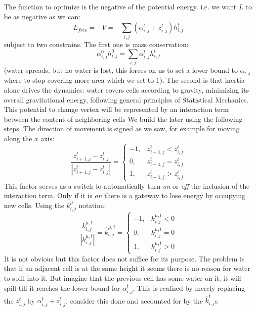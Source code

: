 \documentclass[%
 reprint,
 amsmath,amssymb,
 aps,
]{revtex4-2}
\begin{document}
The function to optimize is the negative of the potential energy. i.e. we want $L$ to be as negative as we can:
 \begin{equation}
  L_{free} = -V = -  \sum_{i,j}(\alpha_{i,j}^t + z_{i,j}^t)h_{i,j}^t
\end{equation}
subject to two constrains. The first one is mass conservation: 
\begin{equation}
    \alpha_{i,j}^0h_{i,j}^0 = \sum_{i,j}\alpha_{i,j}^th_{i,j}^t
\end{equation}
 (water spreads, but no water is lost, this forces on us to set a lower bound to $\alpha_{i,j}$ where to stop covering more area which we set to $1$). The second is that inertia alone drives the dynamics: water covers cells according to gravity, minimizing its overall gravitational energy, following general principles of Statistical Mechanics\cite{Stat_Mec_Unconf2021}. This potential to change vertex will be represented by an interaction term between the content of neighboring cells We build the later using the following steps. The direction of movement is signed as we saw, for example for moving along the $x$ axis: 
 \begin{equation}    
  \frac{z_{i+1,j}^t - z_{i,j}^t }{|z_{i+1,j}^t - z_{i,j}^t|}=\begin{cases}-1, &  z_{i+1,j}^t < z_{i,j}^t \\0,  &  z_{i+1,j}^t = z_{i,j}^t\\1,  &  z_{i+1,j}^t > z_{i,j}^t 
\end{cases}
 \end{equation}
 This factor serves as a switch to automatically turn \textit{on} or \textit{off} the inclusion of the interaction term. Only if it is \textit{on} there is a gateway to lose energy by occupying new cells. Using the $k_{i,j}^\mu$ notation:
 \begin{equation}    
  \frac{k_{i,j}^{\mu, t}}{|k_{i,j}^{\mu, t}|}=\hat{k}_{i,j}^{\mu,t}=\begin{cases}-1, &  k_{i,j}^{\mu,t} < 0\\0,  &  k_{i,j}^{\mu,t} = 0\\1,  &  k_{i,j}^{\mu,t} > 0
\end{cases}
\end{equation}
It is not obvious but this factor does not suffice for its purpose. The problem is that if an adjacent cell is at the same height it seems there is no reason for water to spill into it. But imagine that the previous cell has some water on it, it will spill till it reaches the lower bound for $\alpha_{i,j}^t$. This is realized by merely replacing the $z_{i,j}^t$ by $\alpha_{i,j}^t + z_{i,j}^t$, consider this done and accounted for by the $\hat{k}_{i,j}^t$s
\end{document}
